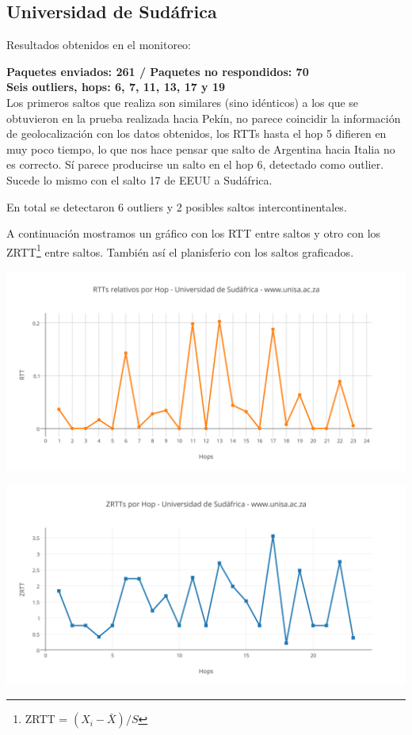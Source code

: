 \subsection{Universidad de Sudáfrica}

Resultados obtenidos en el monitoreo:\\

\smallskip

\bigskip

\textbf{Paquetes enviados: 261 / Paquetes no respondidos: 70}\\

\textbf{Seis outliers, hops: 6, 7, 11, 13, 17 y 19}\\

Los primeros saltos que realiza son similares (sino idénticos) a los que se obtuvieron en la prueba realizada hacia 
Pekín, no parece coincidir la información de geolocalización con los datos obtenidos, los RTTs hasta el hop 5 difieren en
muy poco tiempo, lo que nos hace pensar que salto de Argentina hacia Italia no es correcto.
Sí parece producirse un salto en el hop 6, detectado como outlier. Sucede lo mismo con el salto 17 de EEUU a Sudáfrica.

En total se detectaron 6 outliers y 2 posibles saltos intercontinentales.

A continuación mostramos un gráfico con los RTT entre saltos y otro con los ZRTT\footnote{ZRTT = $(X_i - \bar{X}) / S$}  entre saltos. También así el planisferio con los saltos graficados.

\includegraphics[scale=0.65]{imagenes/sudafrica/RTTs.png} 

\includegraphics[scale=0.65]{imagenes/sudafrica/ZRTTs.png}

